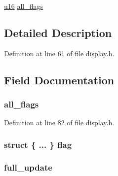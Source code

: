 \begin{DoxyCompactItemize}
\begin{tabbing}
\end{tabbing}\item 
\hyperlink{main__ED__BM_8c_a9e6c91d77e24643b888dbd1a1a590054}{u16} \hyperlink{unions__display__flags_abf876e68df8575f02084e137cc49266b}{all\-\_\-flags}
\end{DoxyCompactItemize}


\subsection{\-Detailed \-Description}


\-Definition at line 61 of file display.\-h.



\subsection{\-Field \-Documentation}
\hypertarget{unions__display__flags_abf876e68df8575f02084e137cc49266b}{
\subsubsection[{all\-\_\-flags}]{ {\bf all\-\_\-flags}}}\label{unions__display__flags_abf876e68df8575f02084e137cc49266b}


\-Definition at line 82 of file display.\-h.

\hypertarget{unions__display__flags_aae136684576b06db2cd15737bb7f6a14}{
\subsubsection[{flag}]{\setlength{\rightskip}{0pt plus 5cm}struct \{ ... \}   {\bf flag}}}\label{unions__display__flags_aae136684576b06db2cd15737bb7f6a14}
\hypertarget{unions__display__flags_a71c4800011ffd6d7d66b954a94918dc0}{
\subsubsection[{full\-\_\-update}]{ {\bf full\-\_\-update}}}\label{unions__display__flags_a71c4800011ffd6d7d66b954a94918dc0}


